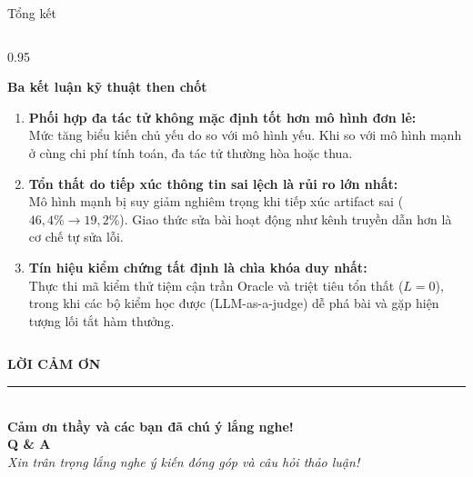 \documentclass[aspectratio=169,10pt]{beamer}
\begin{document}
\begin{frame}{Tổng kết}
  \begin{columns}[c]
    \begin{column}{0.95\textwidth}
      \begin{block}{\textbf{Ba kết luận kỹ thuật then chốt}}
        \begin{enumerate}\normalsize
          \item[\textbf{1.}] \textbf{Phối hợp đa tác tử không mặc định tốt hơn mô hình đơn lẻ:}\\
          Mức tăng biểu kiến chủ yếu do so với mô hình yếu. Khi so với mô hình mạnh ở cùng chi phí tính toán, đa tác tử thường hòa hoặc thua.
          \vspace{4pt}
          
          \item[\textbf{2.}] \textbf{Tổn thất do tiếp xúc thông tin sai lệch là rủi ro lớn nhất:}\\
          Mô hình mạnh bị suy giảm nghiêm trọng khi tiếp xúc artifact sai ($46{,}4\% \to 19{,}2\%$). Giao thức sửa bài hoạt động như kênh truyền dẫn hơn là cơ chế tự sửa lỗi.
          \vspace{4pt}
          
          \item[\textbf{3.}] \textbf{Tín hiệu kiểm chứng tất định là chìa khóa duy nhất:}\\
          Thực thi mã kiểm thử tiệm cận trần Oracle và triệt tiêu tổn thất ($L=0$), trong khi các bộ kiểm học được (LLM-as-a-judge) dễ phá bài và gặp hiện tượng lối tắt hàm thưởng.
        \end{enumerate}
      \end{block}
    \end{column}
  \end{columns}
\end{frame}

\begin{frame}[plain]
  
  \centering
  \color{white}
  \vspace{1.2cm}
  
  {\Huge\bfseries LỜI CẢM ƠN}\\[10pt]
  {\color{AmberGold}\rule{0.25\linewidth}{1.5pt}}\\[24pt]
  
  {\Large\bfseries Cảm ơn thầy và các bạn đã chú ý lắng nghe!}\\[32pt]
  
  {\LARGE\bfseries Q \& A}\\[8pt]
  {\normalsize\itshape Xin trân trọng lắng nghe ý kiến đóng góp và câu hỏi thảo luận!}
\end{frame}
\end{document}

